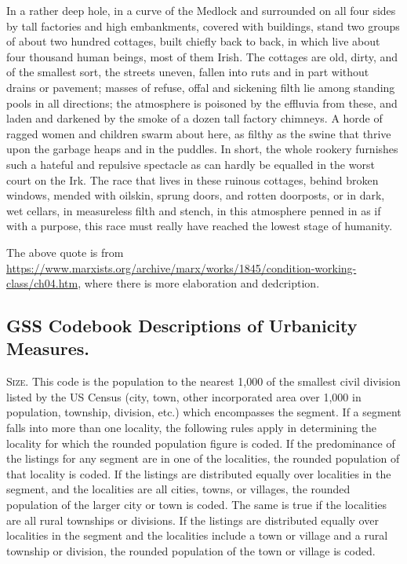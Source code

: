 \documentclass[11pt, letterpaper]{article}
\begin{document}
\begin{spacing}{1.4}
 In a rather deep hole, in a curve of the Medlock and surrounded on all four
 sides by tall factories and high embankments, covered with buildings, stand two
 groups of about two hundred cottages, built chiefly back to back, in which live
 about four thousand human beings, most of them Irish. The cottages are old,
 dirty, and of the smallest sort, the streets uneven, fallen into ruts and in
 part without drains or pavement; masses of refuse, offal and sickening filth
 lie among standing pools in all directions; the atmosphere is poisoned by the
 effluvia from these, and laden and darkened by the smoke of a dozen tall
 factory chimneys. A horde of ragged women and children swarm about here, as
 filthy as the swine that thrive upon the garbage heaps and in the puddles. In
 short, the whole rookery furnishes such a hateful and repulsive spectacle as
 can hardly be equalled in the worst court on the Irk. The race that lives in
 these ruinous cottages, behind broken windows, mended with oilskin, sprung
 doors, and rotten doorposts, or in dark, wet cellars, in measureless filth and
 stench, in this atmosphere penned in as if with a purpose, this race must
 really have reached the lowest stage of humanity.

 The above quote is from
 \url{https://www.marxists.org/archive/marx/works/1845/condition-working-class/ch04.htm},
 where there is more elaboration and dedcription. 

\subsection{GSS Codebook Descriptions of Urbanicity Measures.}   

\textsc{Size}. This code is the population to the nearest 1,000 of the smallest civil
division listed by the US Census (city, town, other incorporated
area over 1,000 in population, township, division, etc.) which
encompasses the segment. If a segment falls into more than one
locality, the following rules apply in determining the locality for
which the rounded population figure is coded.
If the predominance of the listings for any segment are in one of the
localities, the rounded population of that locality is coded.
If the listings are distributed equally over localities in the
segment, and the localities are all cities, towns, or villages, the
rounded population of the larger city or town is coded. The same is
true if the localities are all rural townships or divisions.
If the listings are distributed equally over localities in the segment
and the localities include a town or village and a rural township or
division, the rounded population of the town or village is coded.


\end{spacing}
\end{document}
